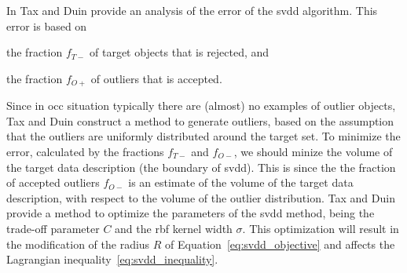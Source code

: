 In \cite{tax2002uniform} Tax and Duin provide an analysis of the error of the \gls{svdd} algorithm.
This error is based on
\begin{inparaenum}[\itshape 1\upshape)]
\item the fraction $f_{T-}$ of target objects that is rejected, and
\item the fraction $f_{O+}$ of outliers that is accepted.
\end{inparaenum}
Since in \gls{occ} situation typically there are (almost) no examples of outlier objects, Tax and Duin construct a method to generate outliers, based on the assumption that the outliers are uniformly distributed around the target set.
To minimize the error, calculated by the fractions $f_{T-}$ and $f_{O-}$, we should minize the volume of the target data description (\ie the boundary of \gls{svdd}).
This is since the the fraction of accepted outliers $f_{O-}$ is an estimate of the volume of the target data description, with respect to the volume of the outlier distribution.
Tax and Duin provide a method to optimize the parameters of the \gls{svdd} method, being the trade-off parameter $C$ and the \gls{rbf} kernel width $\sigma$.
This optimization will result in the modification of the radius $R$ of Equation~\ref{eq:svdd_objective} and affects the Lagrangian inequality~\ref{eq:svdd_inequality}.


